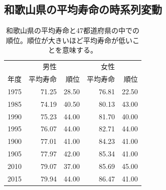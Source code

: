 


\subsection{和歌山県の平均寿命の時系列変動}







\begin{table}[ht]
\caption{和歌山県の平均寿命と47都道府県の中での順位。順位が大きいほど平均寿命が低いことを意味する。}
\centering
\begin{tabular}{r|rr|rr}
  \hline
	 & 男性 &  & 女性 &  \\
	年度 & 平均寿命 & 順位 & 平均寿命 & 順位 \\
  \hline
  1975 & 71.25 & 28.50 & 76.81 & 22.50 \\
  1985 & 74.19 & 40.50 & 80.13 & 43.00 \\
  1990 & 75.23 & 44.00 & 81.70 & 40.00 \\
  1995 & 76.07 & 44.00 & 82.71 & 44.00 \\
  1900 & 77.01 & 41.00 & 84.23 & 41.00 \\
  1905 & 77.97 & 42.00 & 85.34 & 41.00 \\
  2010 & 79.07 & 37.00 & 85.69 & 45.00 \\
  2015 & 79.94 & 44.00 & 86.47 & 41.00 \\
   \hline
\end{tabular}

\end{table}





